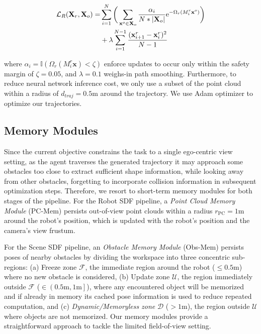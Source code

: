 \documentclass[letterpaper, 10 pt, conference]{ieeeconf}  %
\begin{document}
\vspace{-3mm}
\begin{align}
    \mathcal{L}_R(\mathbf{X}_r, \mathbf{X}_o) = & \sum_{i=1}^{N} \bigg( \sum_{\mathbf{x}^o \in \mathbf{X}_o}{ \frac{\alpha_i}{N*|\mathbf{X}_o|} \mathrm{e}^{- \Omega_r(M_i^r \mathbf{x}^o)} } \bigg) \notag\\
    & + \lambda \sum_{i=1}^{N - 1} \frac{ ( \mathbf{x}_{i+1}^r - \mathbf{x}_i^r )^2 }{N-1}
\end{align}


\noindent where $\alpha_i = \mathbb{I}(\Omega_r(M_i^r \mathbf{x}) < \zeta)$ enforce updates to occur only within the safety margin of $\zeta=0.05$, and $\lambda=0.1$ weighs-in path smoothing.
Furthermore, to reduce neural network inference cost, we only use a subset of the point cloud within a radius of $d_{traj}=0.5$m around the trajectory.
We use Adam optimizer to optimize our trajectories.

\subsection{Memory Modules}

Since the current objective constrains the task to a single ego-centric view setting, as the agent traverses the generated trajectory it may approach some obstacles too close to extract sufficient shape information, while looking away from other obstacles, forgetting to incorporate collision information in subsequent optimization steps.
Therefore, we resort to short-term memory modules for both stages of the pipeline.
For the Robot SDF pipeline, a \emph{Point Cloud Memory Module} (PC-Mem) persists out-of-view point clouds within a radius $r_{\mathrm{PC}}=1\mathrm{m}$ around the robot's position, which is updated with the robot's position and the camera's view frustum.

For the Scene SDF pipeline, an \emph{Obstacle Memory Module} (Obs-Mem) persists poses of nearby obstacles by dividing the workspace into three concentric sub-regions:
(a) Freeze zone $\mathcal{F}$, the immediate region around the robot ($\leq0.5\mathrm{m}$) where no new obstacle is considered,
(b) Update zone $\mathcal{U}$, the region immediately outside $\mathcal{F}$ ($\in \left(0.5\mathrm{m}, 1\mathrm{m}\right]$), where any encountered object will be memorized and if already in memory its cached pose information is used to reduce repeated computation, and
(c) \textit{Dynamic/Memoryless zone} $\mathcal{D}$ ($>1\mathrm{m}$), the region outside $\mathcal{U}$ where objects are not memorized.
Our memory modules provide a straightforward approach to tackle the limited field-of-view setting.
\end{document}
